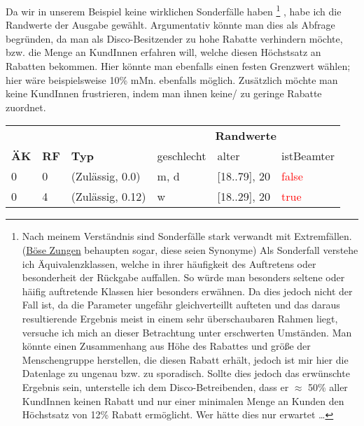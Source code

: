 \documentclass{article}
\begin{document}
\begin{enumerate}[label=\alph*.]
            Da wir in unserem Beispiel keine wirklichen Sonderfälle haben
            \footnote{
                Nach meinem Verständnis sind Sonderfälle stark verwandt mit Extremfällen.
                (\href{https://www.google.com/search?q=sonderfall+extremfall+synonym}{Böse Zungen} behaupten sogar, diese seien Synonyme)
                Als Sonderfall verstehe ich Äquivalenzklassen, welche in ihrer häufigkeit des Auftretens oder besonderheit der Rückgabe auffallen.
                So würde man besonders seltene oder häifig auftretende Klassen hier besonders erwähnen.
                Da dies jedoch nicht der Fall ist, da die Parameter ungefähr gleichverteillt aufteten und das daraus resultierende Ergebnis meist in einem sehr überschaubaren Rahmen liegt, versuche ich mich an dieser Betrachtung unter erschwerten Umständen.
                Man könnte einen Zusammenhang aus Höhe des Rabattes und größe der Menschengruppe herstellen, die diesen Rabatt erhält, jedoch ist mir hier die Datenlage zu ungenau bzw. zu sporadisch.
                Sollte dies jedoch das erwünschte Ergebnis sein, unterstelle ich dem Disco-Betreibenden, dass er $\approx$ 50\% aller KundInnen keinen Rabatt und nur einer minimalen Menge an Kunden den Höchstsatz von 12\% Rabatt ermöglicht.
                Wer hätte dies nur erwartet \ldots
            }
            , habe ich die Randwerte der Ausgabe gewählt.
            Argumentativ könnte man dies als Abfrage begründen, da man als Disco-Besitzender zu hohe Rabatte verhindern möchte, bzw. die Menge an KundInnen erfahren will, welche diesen Höchstsatz an Rabatten bekommen.
            Hier könnte man ebenfalls einen festen Grenzwert wählen; hier wäre beispielsweise 10\% mMn. ebenfalls möglich.
            Zusätzlich möchte man keine KundInnen frustrieren, indem man ihnen keine/ zu geringe Rabatte zuordnet.\\
            
            \begin{tabularx}{\textwidth}{|p{3em}|p{3em}|X|p{5em}|p{7em}|p{5em}|}
                \hline
                \cellcolor[gray]{0.75} & \cellcolor[gray]{0.75} & \cellcolor[gray]{0.75} & \multicolumn{3}{c|}{\cellcolor[gray]{0.75} \textbf{Randwerte}}\\
                \multirow{-2}{*}{\cellcolor[gray]{0.75} \textbf{ÄK}} & \multirow{-2}{*}{\cellcolor[gray]{0.75} \textbf{RF}} & \multirow{-2}{*}{\cellcolor[gray]{0.75} \textbf{Typ}} & \cellcolor[gray]{0.75} geschlecht & \cellcolor[gray]{0.75} alter & \cellcolor[gray]{0.75} istBeamter\\\hline  
                0 & 0 & (Zulässig, 0.0) & m, d & [18..79], 20 & \textcolor{red}{false}\\\hline
                0 & 4 & (Zulässig, 0.12) & w & [18..29], 20 & \textcolor{red}{true}\\\hline
            \end{tabularx}


\end{enumerate}
\end{document}
